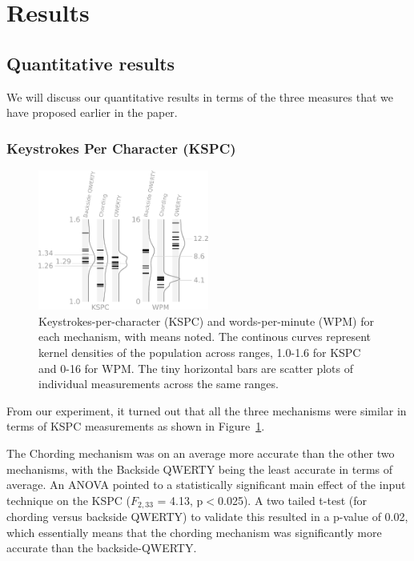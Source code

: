 \section{Results}
\subsection{Quantitative results}

We will discuss our quantitative results in terms of the three measures that we have proposed earlier in the paper.

\subsubsection{Keystrokes Per Character (KSPC)}

\begin{figure}
    \includegraphics[width=0.5\textwidth]{Figures/kspc_and_wpm.pdf} 
    \caption{Keystrokes-per-character (KSPC) and words-per-minute (WPM) for each mechanism, with means noted. The continous curves represent kernel densities of the population across ranges, 1.0-1.6 for KSPC and 0-16 for WPM. The tiny horizontal bars are scatter plots of individual measurements across the same ranges.}
    \label{fig:kspc_and_wpm}
\end{figure}
From our experiment, it turned out that all the three mechanisms were similar
in terms of KSPC measurements as shown in
Figure~\ref{fig:kspc_and_wpm}.

The Chording mechanism was on an average more accurate than the other two mechanisms, with the Backside QWERTY being the least accurate in terms of average. An ANOVA pointed to a statistically significant main effect of the input technique on the KSPC ($F_{2,33}$ = 4.13, p$<$0.025). A two tailed t-test (for chording versus backside QWERTY) to validate this resulted in a p-value of 0.02, which essentially means that the chording mechanism was significantly more accurate than the backside-QWERTY. 

